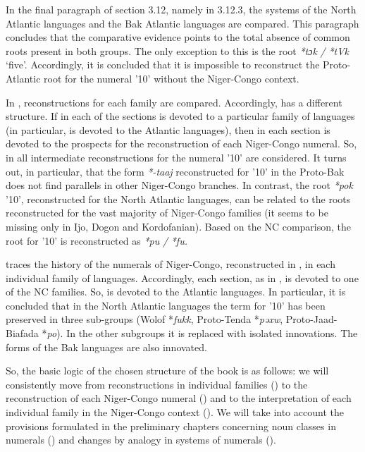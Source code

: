 In the final paragraph of section 3.12, namely in 3.12.3, the systems of the North Atlantic languages and the Bak Atlantic languages are compared. This paragraph concludes that the comparative evidence points to the total absence of common roots present in both groups. The only exception to this is the root \textit{*tɔk} \textit{/} \textit{*tVk} ‘five'. Accordingly, it is concluded that it is impossible to reconstruct the Proto-Atlantic root for the numeral '10' without the Niger-Congo context.

In , reconstructions for each family are compared. Accordingly,  has a different structure. If in  each of the sections is devoted to a particular family of languages (in particular,  is devoted to the Atlantic languages), then in  each section is devoted to the prospects for the reconstruction of each Niger-Congo numeral. So, in  all intermediate reconstructions for the numeral '10' are considered. It turns out, in particular, that the form \textit{*-taaj} reconstructed for '10' in the Proto-Bak does not find parallels in other Niger-Congo branches. In contrast, the root \textit{*pok} '10', reconstructed for the North Atlantic languages, can be related to the roots reconstructed for the vast majority of Niger-Congo families (it seems to be missing only in Ijo, Dogon and Kordofanian). Based on the NC comparison, the root for '10' is reconstructed as \textit{*pu} \textit{/} \textit{*fu.}

 traces the history of the numerals of Niger-Congo, reconstructed in , in each individual family of languages. Accordingly, each section, as in , is devoted to one of the NC families. So,  is devoted to the Atlantic languages. In particular, it is concluded that in the North Atlantic languages the term for '10' has been preserved in three sub-groups (Wolof *\textit{fukk}, Proto-Tenda *\textit{pəxw}, Proto-Jaad-Biafada *\textit{po}). In the other subgroups it is replaced with isolated innovations. The forms of the Bak languages are also innovated.

So, the basic logic of the chosen structure of the book is as follows: we will consistently move from reconstructions in individual families () to the reconstruction of each Niger-Congo numeral () and to the interpretation of each individual family in the Niger-Congo context (). We will take into account the provisions formulated in the preliminary chapters concerning noun classes in numerals () and changes by analogy in systems of numerals ().

